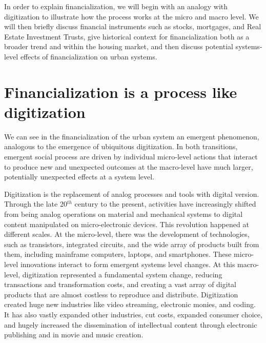 In order to explain financialization, we will begin with an analogy with digitization to illustrate how the process works at the micro and macro level. We will then briefly discuss financial instruments such as stocks, mortgages, and Real Estate Investment Trusts, give historical context for financialization both as a broader trend and within the housing market, and then discuss potential systems-level effects of financialization on urban systems.


\section{Financialization is a process like digitization}

We can see in the  financialization of the urban system an \gls{emergent} phenomenon, analogous to the emergence of ubiquitous \gls{digitization}.
In both transitions, emergent social process are driven by individual micro-level actions that interact to produce new  and unexpected outcomes at the macro-level
have much larger, potentially unexpected effects at a system level. %

Digitization is the replacement of analog processes and tools with digital version. Through the late 20$^{th}$ century to the present, activities have increasingly shifted from being analog operations on material and mechanical systems to digital content manipulated on micro-electronic devices. 
This revolution happened at different scales. At the micro-level, there was the development of technologies, such as transistors, integrated circuits, and the wide array of products built from them, including mainframe computers, laptops, and smartphones.  These micro-level innovations interact to form emergent systems level changes. At this macro-level, digitization represented a fundamental system change, reducing transactions and transformation costs, and creating a vast array of digital products that are almost costless to reproduce and distribute. Digitization created huge new industries like video streaming, electronic monies, and coding. It has also vastly expanded other industries, %
cut costs, expanded consumer choice, %
and hugely increased the dissemination of intellectual content through electronic publishing and in movie and music creation.   

